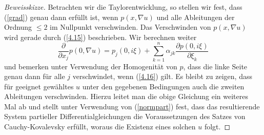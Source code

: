 \begin{proof} [Beweisskizze]
Betrachten wir die Taylorentwicklung, so stellen wir fest, dass (\ref{grad}) genau dann erfüllt ist, wenn $p(x,\nabla u)$ und alle Ableitungen der Ordnung $\le 2$ im Nullpunkt verschwinden. Das Verschwinden von $p(x,\nabla u)$ wird gerade durch (\ref{4.15}) beschrieben. Wir berechnen weiter
\[
\dfrac{\partial}{\partial x_j} p(0,\nabla u) = 
p_j(0,i\xi) + \sum_{k=1}^{n} \alpha_{jk} \dfrac{\partial p(0,i\xi)}{\partial \xi_k}
\]
und bemerken unter Verwendung der Homogenität von $p$, dass die linke Seite genau dann für alle $j$ verschwindet, wenn (\ref{4.16}) gilt. Es bleibt zu zeigen, dass für geeignet gewähltes $u$ unter den gegebenen Bedingungen auch die zweiten Ableitungen verschwinden. Hierzu leitet man die obige Gleichung ein weiteres Mal ab und stellt unter Verwendung von (\ref{normpart}) fest, dass das resultierende System partieller Differentialgleichungen die Voraussetzungen des Satzes von Cauchy-Kovalevsky erfüllt, woraus die Existenz eines solchen $u$ folgt.
\end{proof}

